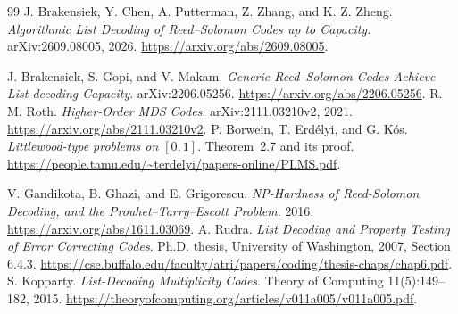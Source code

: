 \documentclass[11pt,letterpaper]{article}
\theoremstyle{definition}
\theoremstyle{remark}
\begin{document}
\begin{thebibliography}{99}
 J. Brakensiek, Y. Chen, A. Putterman,
Z. Zhang, and K. Z. Zheng.
\emph{Algorithmic List Decoding of Reed--Solomon Codes up to Capacity}.
arXiv:2609.08005, 2026.
\url{https://arxiv.org/abs/2609.08005}.

 J. Brakensiek, S. Gopi, and V. Makam.
\emph{Generic Reed--Solomon Codes Achieve List-decoding Capacity}.
arXiv:2206.05256. \url{https://arxiv.org/abs/2206.05256}.
 R. M. Roth. \emph{Higher-Order MDS Codes}.
arXiv:2111.03210v2, 2021. \url{https://arxiv.org/abs/2111.03210v2}.
 P. Borwein, T. Erd\'elyi, and G. K\'os.
\emph{Littlewood-type problems on $[0,1]$}.
Theorem~2.7 and its proof.
\url{https://people.tamu.edu/~terdelyi/papers-online/PLMS.pdf}.

 V. Gandikota, B. Ghazi, and E. Grigorescu.
\emph{NP-Hardness of Reed-Solomon Decoding, and the Prouhet--Tarry--Escott Problem}.
2016. \url{https://arxiv.org/abs/1611.03069}.
 A. Rudra.
\emph{List Decoding and Property Testing of Error Correcting Codes}.
Ph.D. thesis, University of Washington, 2007, Section 6.4.3.
\url{https://cse.buffalo.edu/faculty/atri/papers/coding/thesis-chaps/chap6.pdf}.
 S. Kopparty.
\emph{List-Decoding Multiplicity Codes}.
Theory of Computing 11(5):149--182, 2015.
\url{https://theoryofcomputing.org/articles/v011a005/v011a005.pdf}.


\end{thebibliography}
\end{document}
